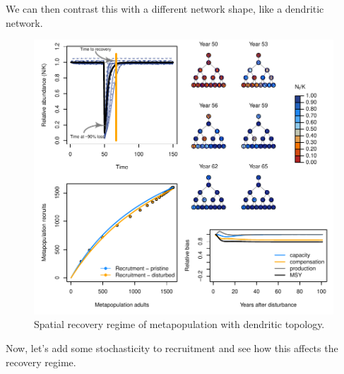 \documentclass[]{article}
\begin{document}
We can then contrast this with a different network shape, like a
dendritic network.

\begin{figure}[H]

{\centering \includegraphics{Managing_for_ecological_surprises_in_metapopulations_makeHTML_files/figure-latex/example results2-1} 

}

\caption{Spatial recovery regime of metapopulation with dendritic topology.}\label{fig:example results2}
\end{figure}

Now, let's add some stochasticity to recruitment and see how this
affects the recovery regime.
\end{document}
